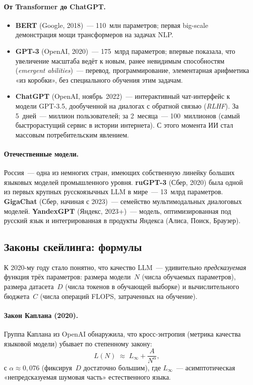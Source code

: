 \paragraph{От Transformer до ChatGPT.}
\begin{itemize}\itemsep1pt
  \item \textbf{BERT} (Google, 2018)~--- 110~млн параметров; первая
        big-scale демонстрация мощи трансформеров на задачах NLP.
  \item \textbf{GPT-3} (OpenAI, 2020)~--- 175~млрд параметров; впервые
        показала, что увеличение масштаба ведёт к новым, ранее
        невидимым способностям (\emph{emergent abilities})~---
        перевод, программирование, элементарная арифметика «из
        коробки», без специального обучения этим задачам.
  \item \textbf{ChatGPT} (OpenAI, ноябрь~2022)~--- интерактивный
        чат-интерфейс к модели GPT-3.5, дообученной на диалогах с
        обратной связью (\emph{RLHF}). За 5~дней~--- миллион
        пользователей; за 2~месяца~--- 100~миллионов
        (самый быстрорастущий сервис в истории интернета). С этого
        момента ИИ стал массовым потребительским явлением.
\end{itemize}

\paragraph{Отечественные модели.}
Россия~--- одна из немногих стран, имеющих собственную линейку больших
языковых моделей промышленного уровня. \textbf{ruGPT-3} (Сбер, 2020)
была одной из первых крупных русскоязычных LLM в мире~---
13~млрд параметров. \textbf{GigaChat} (Сбер, начиная с 2023)~---
семейство мультимодальных диалоговых моделей. \textbf{YandexGPT}
(Яндекс, 2023+)~--- модель, оптимизированная под русский язык и
интегрированная в продукты Яндекса (Алиса, Поиск, Браузер).

\subsection{Законы скейлинга: формулы}
\label{ssec:scaling}

К 2020-му году стало понятно, что качество LLM~--- удивительно
\emph{предсказуемая} функция трёх параметров: размера модели~$N$
(числа обучаемых параметров), размера датасета~$D$ (числа токенов в
обучающей выборке) и вычислительного бюджета~$C$ (числа операций FLOPS,
затраченных на обучение).

\paragraph{Закон Каплана (2020).}
Группа Каплана из OpenAI обнаружила, что кросс-энтропия (метрика
качества языковой модели) убывает по степенному закону:
\begin{equation}\label{eq:kaplan}
L(N)\;\approx\;L_\infty+\frac{A}{N^{\alpha}},
\end{equation}
с $\alpha\approx 0{,}076$ (фиксируя~$D$ достаточно большим), где
$L_\infty$~--- асимптотическая «непредсказуемая шумовая часть»
естественного языка.


